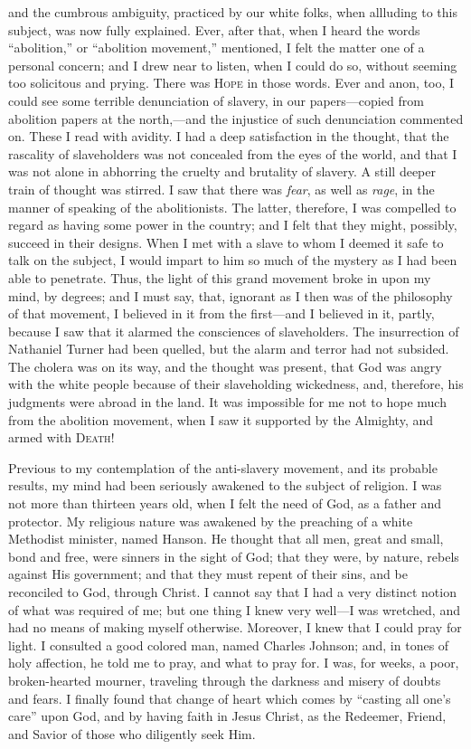 and the cumbrous ambiguity, practiced by our white folks, when allluding
to this subject, was now fully explained. Ever, after that, when I heard
the words ``abolition,'' or ``abolition movement,'' mentioned, I felt
the matter one of a personal concern; and I drew near to listen, when I
could do so, without seeming too solicitous and prying. There was
\textsc{Hope} in those words. Ever and anon, too, I could see some
terrible denunciation of slavery, in our papers---copied from abolition
papers at the north,---and the injustice of such denunciation commented
on. These I read with avidity. I had a deep satisfaction in the thought,
that the rascality of slaveholders was not concealed from the eyes of
the world, and that I was not alone in abhorring the cruelty and
brutality of slavery. A still deeper train of thought was stirred. I saw
that there was \emph{fear}, as well as \emph{rage}, in the manner of
speaking of the abolitionists. The latter, therefore, I was compelled to
regard as having some power in the country; and I felt that they might,
possibly, succeed in their designs. When I met with a slave to whom I
deemed it safe to talk on the subject, I would impart to him so much of
the mystery as I had been able to penetrate. Thus, the light of this
grand movement broke in upon my mind, by degrees; and I must say, that,
ignorant as I then was of the philosophy of that movement, I believed in
it from the first---and I believed in it, partly, because I saw that it
alarmed the consciences of slaveholders. The insurrection of Nathaniel
Turner had been quelled, but the alarm and terror had not subsided. The
cholera was on its way, {\protect\hypertarget{166}{}{}}and the thought
was present, that God was angry with the white people because of their
slaveholding wickedness, and, therefore, his judgments were abroad in
the land. It was impossible for me not to hope much from the abolition
movement, when I saw it supported by the Almighty, and armed with
\textsc{Death}!

Previous to my contemplation of the anti-slavery movement, and its
probable results, my mind had been seriously awakened to the subject of
religion. I was not more than thirteen years old, when I felt the need
of God, as a father and protector. My religious nature was awakened by
the preaching of a white Methodist minister, named Hanson. He thought
that all men, great and small, bond and free, were sinners in the sight
of God; that they were, by nature, rebels against His government; and
that they must repent of their sins, and be reconciled to God, through
Christ. I cannot say that I had a very distinct notion of what was
required of me; but one thing I knew very well---I was wretched, and had
no means of making myself otherwise. Moreover, I knew that I could pray
for light. I consulted a good colored man, named Charles Johnson; and,
in tones of holy affection, he told me to pray, and what to pray for. I
was, for weeks, a poor, broken-hearted mourner, traveling through the
darkness and misery of doubts and fears. I finally found that change of
heart which comes by ``casting all one's care'' upon God, and by having
faith in Jesus Christ, as the Redeemer, Friend, and Savior of those who
diligently seek Him.

